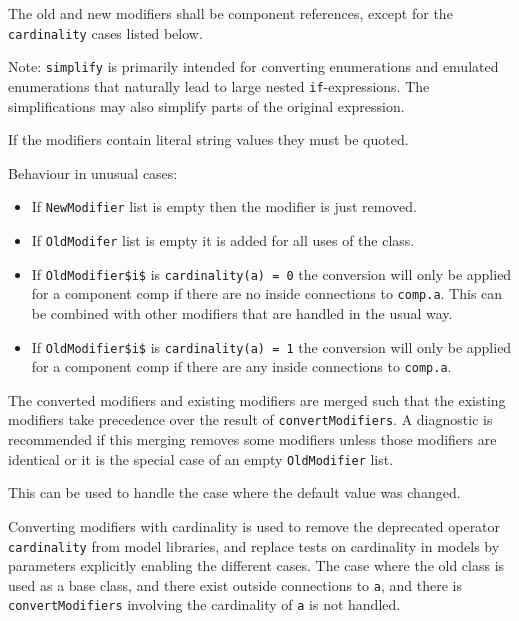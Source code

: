 The old and new modifiers shall be component references, except for the \lstinline!cardinality! cases listed below.

\begin{nonnormative}
Note: \lstinline!simplify! is primarily intended for converting enumerations and emulated enumerations that naturally lead to large nested \lstinline!if!-expressions.
The simplifications may also simplify parts of the original expression.
\end{nonnormative}

If the modifiers contain literal string values they must be quoted.

Behaviour in unusual cases:
\begin{itemize}
\item
  If \lstinline!NewModifier! list is empty then the modifier is just removed.
\item
  If \lstinline!OldModifer! list is empty it is added for all uses of the class.
\item
  If \lstinline!OldModifier$i$! is \lstinline!cardinality(a) = 0! the conversion will only be applied for a component comp if there are no inside connections to \lstinline!comp.a!.
  This can be combined with other modifiers that are handled in the usual way.
\item
  If \lstinline!OldModifier$i$! is \lstinline!cardinality(a) = 1! the conversion will only be applied for a component comp if there are any inside connections to \lstinline!comp.a!.
\end{itemize}

The converted modifiers and existing modifiers are merged such that the existing modifiers take precedence over the result of \lstinline!convertModifiers!.
A diagnostic is recommended if this merging removes some modifiers unless those modifiers are identical or it is the special case of an empty \lstinline!OldModifier! list.
\begin{nonnormative}
This can be used to handle the case where the default value was changed.
\end{nonnormative}

Converting modifiers with cardinality is used to remove the deprecated operator \lstinline!cardinality! from model libraries, and replace tests on cardinality in models by parameters explicitly enabling the different cases.
The case where the old class is used as a base class, and there exist outside connections to \lstinline!a!, and there is \lstinline!convertModifiers! involving the cardinality of \lstinline!a! is not handled.

